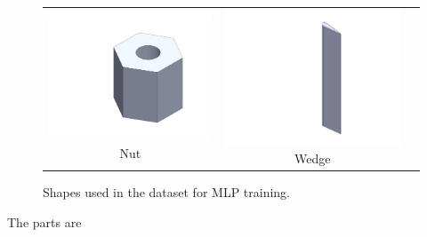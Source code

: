 \begin{figure}[htbp]
\begin{minipage}{0.5\textwidth}
\begin{tabular}{ccc}
      \begin{minipage}{0.3\linewidth}
        \centering
        \includegraphics[width=\linewidth]{figures/parts/nut.PNG}
        \scriptsize Nut
      \end{minipage} &
      \begin{minipage}{0.3\linewidth}
        \centering
        \includegraphics[width=\linewidth]{figures/parts/wedge.PNG}
        \scriptsize Wedge
      \end{minipage} &
      \begin{minipage}{0.3\linewidth} \end{minipage} \\
    \end{tabular}
  \end{minipage}

  \caption{Shapes used in the dataset for MLP training.}
  \label{fig:part_shapes_grid}
\end{figure}

The parts are 














